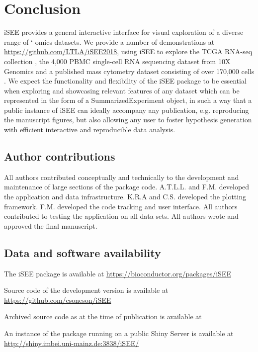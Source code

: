\documentclass[10pt,a4paper,twocolumn]{article}
\begin{document}
\section*{Conclusion}
iSEE provides a general interactive interface for visual exploration of a diverse range of `-omics datasets.
We provide a number of demonstrations at \url{https://github.com/LTLA/iSEE2018}, using iSEE to explore the TCGA RNA-seq collection \citep{piccolo2015TCGA}, the 4,000 PBMC single-cell RNA sequencing dataset from 10X Genomics \citep{zheng2017massively} and a published mass cytometry dataset consisting of over 170,000 cells \citep{bodenmiller2012cytof}.
We expect the functionality and flexibility of the iSEE package to be essential when exploring and showcasing relevant features of any dataset which can be represented in the form of a SummarizedExperiment object, in such a way that a public instance of iSEE can ideally accompany any publication, e.g. reproducing the manuscript figures, but also allowing any user to foster hypothesis generation with efficient interactive and reproducible data analysis.

\subsection*{Author contributions}
All authors contributed conceptually and technically to the development and maintenance of large sections of the package code.
A.T.L.L. and F.M. developed the application and data infrastructure.
K.R.A and C.S. developed the plotting framework.
F.M. developed the code tracking and user interface.
All authors contributed to testing the application on all data sets.
All authors wrote and approved the final manuscript.

\subsection*{Data and software availability}
The iSEE package is available at \url{https://bioconductor.org/packages/iSEE}

Source code of the development version is available at \url{https://github.com/csoneson/iSEE}

Archived source code as at the time of publication is available at %

An instance of the package running on a public Shiny Server is available at \url{http://shiny.imbei.uni-mainz.de:3838/iSEE/}
\end{document}
